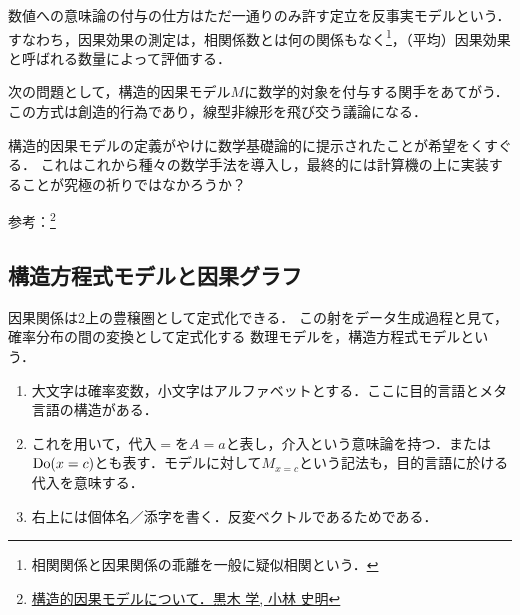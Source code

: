 \documentclass[uplatex,dvipdfmx]{jsreport}
\begin{document}
\begin{tcolorbox}[colframe=ForestGreen, colback=ForestGreen!10!white,breakable,colbacktitle=ForestGreen!40!white,coltitle=black,fonttitle=\bfseries\sffamily,
    title=]
    数値への意味論の付与の仕方はただ一通りのみ許す定立を反事実モデルという．
    すなわち，因果効果の測定は，相関係数とは何の関係もなく\footnote{相関関係と因果関係の乖離を一般に疑似相関という．}，（平均）因果効果と呼ばれる数量によって評価する．

    次の問題として，構造的因果モデル$M$に数学的対象を付与する関手をあてがう．
    この方式は創造的行為であり，線型非線形を飛び交う議論になる．

    構造的因果モデルの定義がやけに数学基礎論的に提示されたことが希望をくすぐる．
    これはこれから種々の数学手法を導入し，最終的には計算機の上に実装することが究極の祈りではなかろうか？

    参考：\footnote{\href{https://www.jstage.jst.go.jp/article/jjb/32/2/32_119/_article/-char/ja/}{構造的因果モデルについて．黒木 学, 小林 史明}}
\end{tcolorbox}

\subsection{構造方程式モデルと因果グラフ}

\begin{tcolorbox}[colframe=ForestGreen, colback=ForestGreen!10!white,breakable,colbacktitle=ForestGreen!40!white,coltitle=black,fonttitle=\bfseries\sffamily,
title=]
    因果関係は2上の豊穣圏として定式化できる．
    この射をデータ生成過程と見て，確率分布の間の変換として定式化する
    数理モデルを，構造方程式モデルという．
\end{tcolorbox}

\begin{notation}[数学基礎論的記号設定]\mbox{}
    \begin{enumerate}
        \item 大文字は確率変数，小文字はアルファベットとする．ここに目的言語とメタ言語の構造がある．
        \item これを用いて，代入$=$を$A=a$と表し，介入という意味論を持つ．または$\mathrm{Do}(x=c)$とも表す．モデルに対して$M_{x=c}$という記法も，目的言語に於ける代入を意味する．
        \item 右上には個体名／添字を書く．反変ベクトルであるためである．
    \end{enumerate}
\end{notation}
\end{document}
